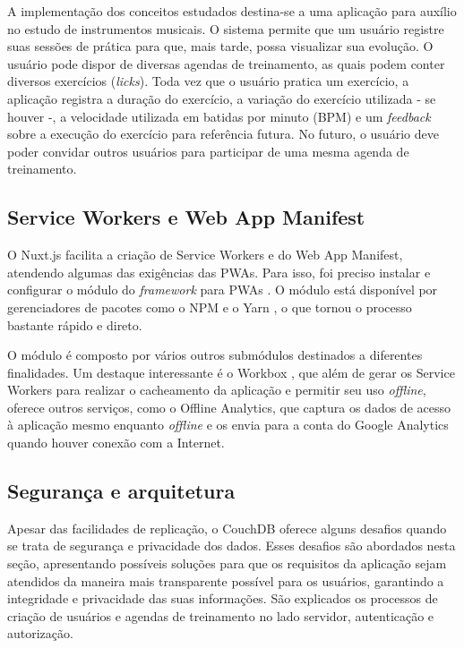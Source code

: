 \documentclass[
	article,			%
	11pt,				%
	oneside,			%
	a4paper,			%
	english,			%
	brazil,				%
	sumario=tradicional
	]{abntex2}
\begin{document}
A implementação dos conceitos estudados destina-se a uma aplicação para auxílio no estudo de instrumentos musicais. O sistema permite que um usuário registre suas sessões de prática para que, mais tarde, possa visualizar sua evolução. O usuário pode dispor de diversas agendas de treinamento, as quais podem conter diversos exercícios (\textit{licks}). Toda vez que o usuário pratica um exercício, a aplicação registra a duração do exercício, a variação do exercício utilizada - se houver -, a velocidade utilizada em batidas por minuto (BPM) e um \textit{feedback} sobre a execução do exercício para referência futura. No futuro, o usuário deve poder convidar outros usuários para participar de uma mesma agenda de treinamento.

\subsection{Service Workers e Web App Manifest}

O Nuxt.js facilita a criação de Service Workers e do Web App Manifest, atendendo algumas das exigências das PWAs. Para isso, foi preciso instalar e configurar o módulo do \textit{framework} para PWAs \cite{nuxt-pwa-2018}. O módulo está disponível por gerenciadores de pacotes como o NPM \cite{npm-2017} e o Yarn \cite{yarn-2017}, o que tornou o processo bastante rápido e direto.

O módulo é composto por vários outros submódulos destinados a diferentes finalidades. Um destaque interessante é o Workbox \cite{workbox-2018}, que além de gerar os Service Workers para realizar o cacheamento da aplicação e permitir seu uso \textit{offline}, oferece outros serviços, como o Offline Analytics, que captura os dados de acesso à aplicação mesmo enquanto \textit{offline} e os envia para a conta do Google Analytics quando houver conexão com a Internet.

\subsection{Segurança e arquitetura}

Apesar das facilidades de replicação, o CouchDB oferece alguns desafios quando se trata de segurança e privacidade dos dados. Esses desafios são abordados nesta seção, apresentando possíveis soluções para que os requisitos da aplicação sejam atendidos da maneira mais transparente possível para os usuários, garantindo a integridade e privacidade das suas informações. São explicados os processos de criação de usuários e agendas de treinamento no lado servidor, autenticação e autorização.
\end{document}
